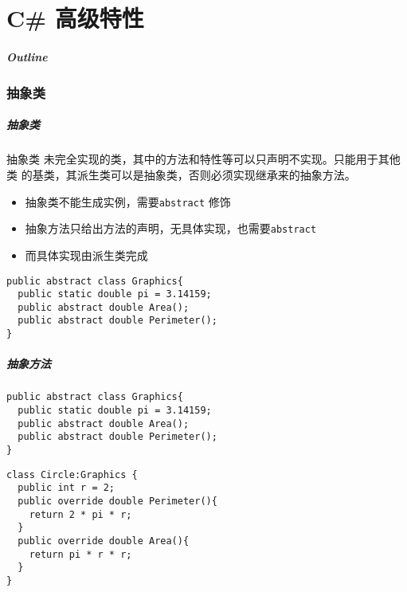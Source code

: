 
\part{C\# 高级特性}
\begin{frame}
\frametitle{Outline}            %
\tableofcontents
\end{frame}

\section{抽象类}

\begin{frame}[fragile]
\frametitle{抽象类}
\begin{block}{抽象类}
  \CJKindent 未完全实现的类，其中的方法和特性等可以只声明不实现。只能用于其他类
  的基类，其派生类可以是抽象类，否则必须实现继承来的抽象方法。
\end{block}
\pause
\begin{itemize}
\item 抽象类不能生成实例，需要\texttt{abstract} 修饰
\item 抽象方法只给出方法的声明，无具体实现，也需要\texttt{abstract}
\item 而具体实现由派生类完成
\end{itemize}
\begin{lstlisting}
public abstract class Graphics{
  public static double pi = 3.14159;
  public abstract double Area();
  public abstract double Perimeter();
}
\end{lstlisting}
\end{frame}

\begin{frame}[fragile]
\frametitle{抽象方法}
\begin{lstlisting}
public abstract class Graphics{
  public static double pi = 3.14159;
  public abstract double Area();
  public abstract double Perimeter();
}
\end{lstlisting}
\begin{lstlisting}
class Circle:Graphics {
  public int r = 2;
  public override double Perimeter(){
    return 2 * pi * r;
  }
  public override double Area(){
    return pi * r * r;
  }
}
\end{lstlisting}
\end{frame}

